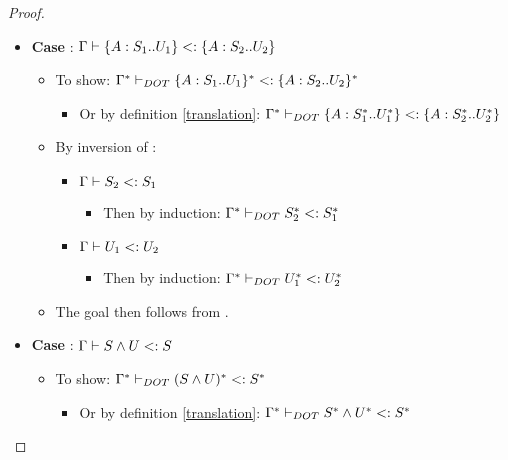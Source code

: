 \begin{proof}
\begin{itemize}
\begin{itemize}
        \end{itemize}
        \item \textbf{Case} :
            $\Gamma \vdash \{A : S_1 .. U_1\} <: \{A : S_2 .. U_2\}$
        \begin{itemize}
            \item To show: $\Gamma^{*} \vdash_{DOT} \{A : S_1 .. U_1\}^{*} <: \{A : S_2 .. U_2\}^{*}$
            \begin{itemize}
                \item Or by definition \ref{translation}:
                    $\Gamma^{*} \vdash_{DOT} \{A : S_1^{*} .. U_1^{*}\} <: \{A : S_2^{*} .. U_2^{*}\}$
            \end{itemize}
            \item By inversion of :
            \begin{itemize}
                \item $\Gamma \vdash S_2 <: S_1$
                \begin{itemize}
                    \item Then by induction:
                        $\Gamma^{*} \vdash_{DOT} S_2^{*} <: S_1^{*}$
                \end{itemize}
                \item $\Gamma \vdash U_1 <: U_2$
                \begin{itemize}
                    \item Then by induction:
                        $\Gamma^{*} \vdash_{DOT} U_1^{*} <: U_2^{*}$
                \end{itemize}
            \end{itemize}
            \item The goal then follows from .
        \end{itemize}
        \item \textbf{Case} : $\Gamma \vdash S \wedge U <: S$
        \begin{itemize}
            \item To show:
                $\Gamma^{*} \vdash_{DOT} (S \wedge U)^{*} <: S^{*}$
            \begin{itemize}
                \item Or by definition \ref{translation}: $\Gamma^{*} \vdash_{DOT} S^{*} \wedge U^{*} <: S^{*}$
            \end{itemize}

\end{itemize}
\end{itemize}
\end{proof}
